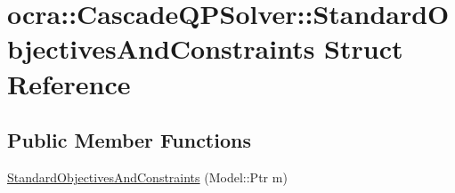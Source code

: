 \hypertarget{structocra_1_1CascadeQPSolver_1_1StandardObjectivesAndConstraints}{}\section{ocra\+:\+:Cascade\+Q\+P\+Solver\+:\+:Standard\+Objectives\+And\+Constraints Struct Reference}
\label{structocra_1_1CascadeQPSolver_1_1StandardObjectivesAndConstraints}
\subsection*{Public Member Functions}
\begin{DoxyCompactItemize}
\item 
\hyperlink{structocra_1_1CascadeQPSolver_1_1StandardObjectivesAndConstraints_afa2f8a2043316e306b16bb8edb26b6f4}{Standard\+Objectives\+And\+Constraints} (Model\+::\+Ptr m)
\end{DoxyCompactItemize}
